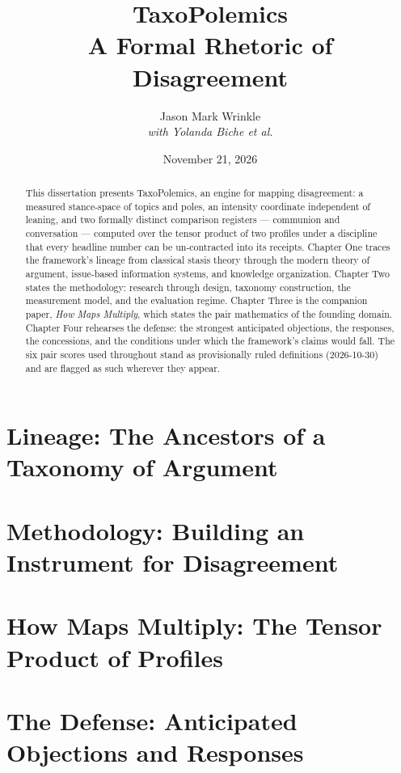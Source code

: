 \documentclass[11pt]{report}
\title{TaxoPolemics\\[0.5em]\large A Formal Rhetoric of Disagreement}
\author{Jason Mark Wrinkle\\[0.3em]\normalsize\textit{with Yolanda Biche et al.}}
\date{November 21, 2026}
\begin{document}
\maketitle

\begin{abstract}
\noindent This dissertation presents TaxoPolemics, an engine for mapping
disagreement: a measured stance-space of topics and poles, an intensity
coordinate independent of leaning, and two formally distinct comparison
registers --- communion and conversation --- computed over the tensor
product of two profiles under a discipline that every headline number can
be un-contracted into its receipts. Chapter One traces the framework's
lineage from classical stasis theory through the modern theory of argument,
issue-based information systems, and knowledge organization. Chapter Two
states the methodology: research through design, taxonomy construction,
the measurement model, and the evaluation regime. Chapter Three is the
companion paper, \textit{How Maps Multiply}, which states the pair
mathematics of the founding domain. Chapter Four rehearses the defense:
the strongest anticipated objections, the responses, the concessions, and
the conditions under which the framework's claims would fall. The six pair
scores used throughout stand as provisionally ruled definitions
(2026-10-30) and are flagged as such wherever they appear.
\end{abstract}

\tableofcontents

\chapter{Lineage: The Ancestors of a Taxonomy of Argument}


\chapter{Methodology: Building an Instrument for Disagreement}


\chapter{How Maps Multiply: The Tensor Product of Profiles}


\chapter{The Defense: Anticipated Objections and Responses}

\end{document}
